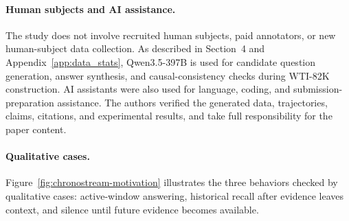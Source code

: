 \paragraph{Human subjects and AI assistance.}
The study does not involve recruited human subjects, paid annotators, or new human-subject data collection.
As described in Section~4 and Appendix~\ref{app:data_stats}, Qwen3.5-397B is used for candidate question generation, answer synthesis, and causal-consistency checks during WTI-82K construction.
AI assistants were also used for language, coding, and submission-preparation assistance.
The authors verified the generated data, trajectories, claims, citations, and experimental results, and take full responsibility for the paper content.

\paragraph{Qualitative cases.}
Figure~\ref{fig:chronostream-motivation} illustrates the three behaviors checked by qualitative cases: active-window answering, historical recall after evidence leaves context, and silence until future evidence becomes available.
